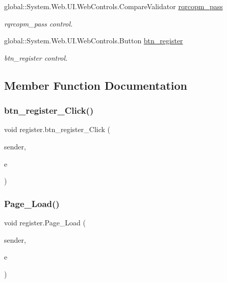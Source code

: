 \begin{DoxyCompactItemize}
global\+::\+System.\+Web.\+U\+I.\+Web\+Controls.\+Compare\+Validator \mbox{\hyperlink{classregister_a6bfe274bf7682911b553549ebfcb72cb}{rqrcopm\+\_\+pass}}
\begin{DoxyCompactList}\small\item\em rqrcopm\+\_\+pass control. \end{DoxyCompactList}\item 
global\+::\+System.\+Web.\+U\+I.\+Web\+Controls.\+Button \mbox{\hyperlink{classregister_a95d65889e8a217375ee982f4c316fad4}{btn\+\_\+register}}
\begin{DoxyCompactList}\small\item\em btn\+\_\+register control. \end{DoxyCompactList}\end{DoxyCompactItemize}


\subsection{Member Function Documentation}
\mbox{\label{classregister_a71861250310b5e264704ebe1b848dc2e}} 
\subsubsection{\texorpdfstring{btn\_register\_Click()}{btn\_register\_Click()}}
{\footnotesize\ttfamily void register.\+btn\+\_\+register\+\_\+\+Click (\begin{DoxyParamCaption}\item[{object}]{sender,  }\item[{Event\+Args}]{e }\end{DoxyParamCaption})\hspace{0.3cm}{\ttfamily [protected]}}

\mbox{\label{classregister_ad970a9929fba7b42ad397e0340ee0e1c}} 
\subsubsection{\texorpdfstring{Page\_Load()}{Page\_Load()}}
{\footnotesize\ttfamily void register.\+Page\+\_\+\+Load (\begin{DoxyParamCaption}\item[{object}]{sender,  }\item[{Event\+Args}]{e }\end{DoxyParamCaption})\hspace{0.3cm}{\ttfamily [protected]}}



